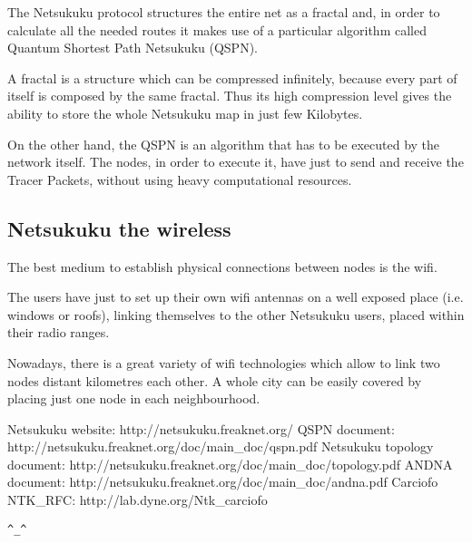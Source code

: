 \documentclass[a4paper]{article}
\newcommand{\href}[2]{ #1 }
\begin{document}
The Netsukuku protocol structures the entire net as a
fractal\cite{ntktopology} and, in order to calculate all the needed routes it
makes use of a particular algorithm called Quantum Shortest Path Netsukuku
(QSPN)\cite{qspndoc}.

A fractal is a structure which can be compressed infinitely, because every
part of itself is composed by the same fractal. Thus its high compression
level gives the ability to store the whole Netsukuku map in just few
Kilobytes.

On the other hand, the QSPN is an algorithm that has to be executed by the
network itself. The nodes, in order to execute it, have just to send and
receive the Tracer Packets, without using heavy computational resources.

\subsection{Netsukuku the wireless}
The best medium to establish physical connections between nodes is the wifi.

The users have just to set up their own wifi antennas on a well exposed place 
(i.e. windows or roofs), linking themselves to the other Netsukuku users,
placed within their radio ranges.

Nowadays, there is a great variety of wifi technologies which allow to link
two nodes distant kilometres each other. A whole city can be easily covered by
placing just one node in each neighbourhood.



\begin{thebibliography}{99}
	 Netsukuku website:
		\href{http://netsukuku.freaknet.org/}{http://netsukuku.freaknet.org/}
	 QSPN document:
		\href{http://netsukuku.freaknet.org/doc/main\_doc/qspn.pdf}{qspn.pdf}
	 Netsukuku topology document:
		\href{http://netsukuku.freaknet.org/doc/main\_doc/topology.pdf}{topology.pdf}
	 ANDNA document:
		\href{http://netsukuku.freaknet.org/doc/main\_doc/andna.pdf}{andna.pdf}
	 Carciofo NTK\_RFC:
		\href{http://lab.dyne.org/Ntk\_carciofo}{Carciofo}

\end{thebibliography}
\newpage

\begin{center}
\verb|^_^|
\end{center}
\end{document}
